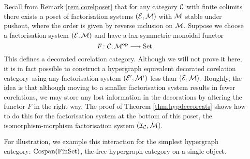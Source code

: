 Recall from Remark \ref{rem.corelposet} that for any category $\mathcal C$ with
finite colimits there exists a poset of factorisation systems $(\mathcal E,\mathcal M)$
with $\mathcal M$ stable under pushout, where the order is given by reverse inclusion
on $\mathcal M$. Suppose we choose a factorisation system $(\mathcal E,\mathcal M)$ and have a
lax symmetric monoidal functor
\[
  F{\colon} \mathcal C;\mathcal M^{\mathrm{op}} \longrightarrow \mathrm{Set}.
\]
This defines a decorated corelation category. Although we will not prove it
here, it is in fact possible to construct a hypergraph equivalent decorated
corelation category using any factorisation system $(\mathcal E',\mathcal M')$ less than
$(\mathcal E,\mathcal M)$. Roughly, the idea is that although moving to a smaller
factorisation system results in fewer corelations, we may store any lost
information in the decorations by altering the functor $F$ in the right way.
The proof of Theorem \ref{thm.hypdeccorcats} shows how to do this for the
factorisation system at the bottom of this poset, the isomorphism-morphism
factorisation system $(\mathcal I_{\mathcal C},\mathcal M)$.

For illustration, we example this interaction for the simplest hypergraph
category: $\operatorname{{Cospan}}(\mathrm{FinSet})$, the free hypergraph category on a single object.

